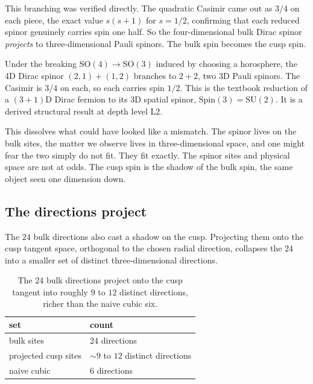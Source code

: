 This branching was verified directly. The quadratic Casimir came out as $3/4$ on each piece, the exact value $s(s+1)$ for $s = 1/2$, confirming that each reduced spinor genuinely carries spin one half. So the four-dimensional bulk Dirac spinor \emph{projects} to three-dimensional Pauli spinors. The bulk spin becomes the cusp spin.

\begin{proposition}
Under the breaking $\mathrm{SO}(4) \to \mathrm{SO}(3)$ induced by choosing a horosphere, the 4D Dirac spinor $(2,1)+(1,2)$ branches to $2+2$, two 3D Pauli spinors. The Casimir is $3/4$ on each, so each carries spin $1/2$. This is the textbook reduction of a $(3+1)$D Dirac fermion to its 3D spatial spinor, $\mathrm{Spin}(3) = \mathrm{SU}(2)$. It is a derived structural result at depth level L2.
\end{proposition}

This dissolves what could have looked like a mismatch. The spinor lives on the bulk sites, the matter we observe lives in three-dimensional space, and one might fear the two simply do not fit. They fit exactly. The spinor sites and physical space are not at odds. The cusp spin is the shadow of the bulk spin, the same object seen one dimension down.

\subsection{The directions project}

The $24$ bulk directions also cast a shadow on the cusp. Projecting them onto the cusp tangent space, orthogonal to the chosen radial direction, collapses the $24$ into a smaller set of distinct three-dimensional directions.

\begin{table}[ht]
\centering
\begin{tabular}{@{}ll@{}}
\toprule
set & count \\
\midrule
bulk sites & 24 directions \\
projected cusp sites & $\sim 9$ to $12$ distinct directions \\
naive cubic & 6 directions \\
\bottomrule
\end{tabular}
\caption{The $24$ bulk directions project onto the cusp tangent into roughly $9$ to $12$ distinct directions, richer than the naive cubic six.}
\label{tab:direction-projection}
\end{table}

